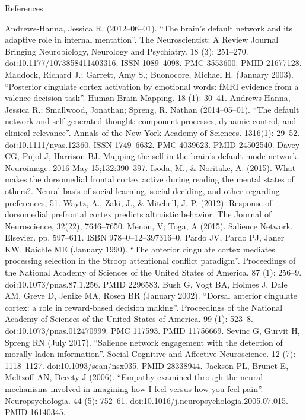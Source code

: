 \documentclass[twocolumn]{article}
\begin{document}
\pagebreak


References

Andrews-Hanna, Jessica R. (2012–06–01). “The brain’s default network and its adaptive role in internal mentation”. The Neuroscientist: A Review Journal Bringing Neurobiology, Neurology and Psychiatry. 18 (3): 251–270. doi:10.1177/1073858411403316. ISSN 1089–4098. PMC 3553600. PMID 21677128.
Maddock, Richard J.; Garrett, Amy S.; Buonocore, Michael H. (January 2003). “Posterior cingulate cortex activation by emotional words: fMRI evidence from a valence decision task”. Human Brain Mapping. 18 (1): 30–41.
Andrews-Hanna, Jessica R.; Smallwood, Jonathan; Spreng, R. Nathan (2014–05–01). “The default network and self-generated thought: component processes, dynamic control, and clinical relevance”. Annals of the New York Academy of Sciences. 1316(1): 29–52. doi:10.1111/nyas.12360. ISSN 1749–6632. PMC 4039623. PMID 24502540.
Davey CG, Pujol J, Harrison BJ. Mapping the self in the brain’s default mode network. Neuroimage. 2016 May 15;132:390–397.
Isoda, M., \& Noritake, A. (2015). What makes the dorsomedial frontal cortex active during reading the mental states of others?. Neural basis of social learning, social deciding, and other-regarding preferences, 51.
Waytz, A., Zaki, J., \& Mitchell, J. P. (2012). Response of dorsomedial prefrontal cortex predicts altruistic behavior. The Journal of Neuroscience, 32(22), 7646–7650.
Menon, V; Toga, A (2015). Salience Network. Elsevier. pp. 597–611. ISBN 978–0–12–397316–0.
Pardo JV, Pardo PJ, Janer KW, Raichle ME (January 1990). “The anterior cingulate cortex mediates processing selection in the Stroop attentional conflict paradigm”. Proceedings of the National Academy of Sciences of the United States of America. 87 (1): 256–9. doi:10.1073/pnas.87.1.256. PMID 2296583.
Bush G, Vogt BA, Holmes J, Dale AM, Greve D, Jenike MA, Rosen BR (January 2002). “Dorsal anterior cingulate cortex: a role in reward-based decision making”. Proceedings of the National Academy of Sciences of the United States of America. 99 (1): 523–8. doi:10.1073/pnas.012470999. PMC 117593. PMID 11756669.
Sevinc G, Gurvit H, Spreng RN (July 2017). “Salience network engagement with the detection of morally laden information”. Social Cognitive and Affective Neuroscience. 12 (7): 1118–1127. doi:10.1093/scan/nsx035. PMID 28338944.
Jackson PL, Brunet E, Meltzoff AN, Decety J (2006). “Empathy examined through the neural mechanisms involved in imagining how I feel versus how you feel pain”. Neuropsychologia. 44 (5): 752–61. doi:10.1016/j.neuropsychologia.2005.07.015. PMID 16140345.
\end{document}
